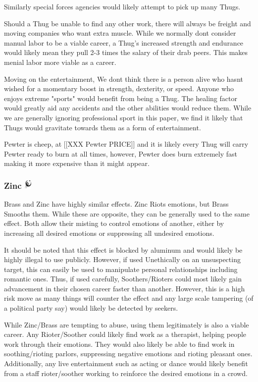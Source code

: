 \documentclass[conference]{IEEEtran}
\newcommand{\n}{\hfill\break}
\begin{document}
	Similarly special forces agencies would likely attempt to pick up many Thugs.  
	
	Should a Thug be unable to find any other work, there will always be freight and moving companies who want extra muscle.  While we normally dont consider manual labor to be a viable career, a Thug's increased strength and endurance would likely mean they pull 2-3 times the salary of their drab peers.  This makes menial labor more viable as a career.\n
	
	Moving on the entertainment, We dont think there is a person alive who hasnt wished for a momentary boost in strength, dexterity, or speed.  Anyone who enjoys extreme "sports" would benefit from being a Thug.  The healing factor would greatly aid any accidents and the other abilities would reduce them.  While we are generally ignoring professional sport in this paper, we find it likely that Thugs would gravitate towards them as a form of entertainment.
	
	Pewter is cheep, at [[XXX Pewter PRICE]] and it is likely every Thug will carry Pewter ready to burn at all times, however, Pewter does burn extremely fast making it more expensive than it might appear.\n
	\subsubsection{\textbf{Zinc}    \includegraphics[height=1em]{images/Zinc.png}}\label{sec:mistings:zinc}
	Brass and Zinc have highly similar effects.  Zinc Riots emotions, but Brass Smooths them.  While these are opposite, they can be generally used to the same effect.  Both allow their misting to control emotions of another, either by increasing all desired emotions or suppressing all undesired emotions.
	
	It should be noted that this effect is blocked by aluminum and would likely be highly illegal to use publicly.  However, if used Unethically on an unsuspecting target, this can easily be used to manipulate personal relationships including romantic ones.  Thus, if used carefully, Soothers/Rioters could most likely gain advancement in their chosen career faster than another.  However, this is a high risk move as many things will counter the effect and any large scale tampering (of a political party say) would likely be detected by seekers.
	
	While Zinc/Brass are tempting to abuse, using them legitimately is also a viable career.  Any Rioter/Soother could likely find work as a therapist, helping people work through their emotions.  They would also likely be able to find work in soothing/rioting parlors, suppressing negative emotions and rioting pleasant ones.  Additionally, any live entertainment such as acting or dance would likely benefit from a staff rioter/soother working to reinforce the desired emotions in a crowd.
	
\end{document}

